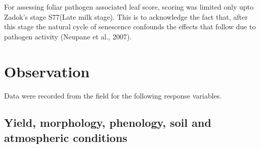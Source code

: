 \documentclass[12pt,oneside]{dukestatscithesis} %
\theoremstyle{definition}
\theoremstyle{definition}
\theoremstyle{definition}
\theoremstyle{remark}
\begin{document}
For assessing foliar pathogen associated leaf score, scoring was limited
only upto Zadok's stage S77(Late milk stage). This is to acknowledge the
fact that, after this stage the natural cycle of senescence confounds
the effects that follow due to pathogen activity (Neupane et al., 2007).

\section{Observation}\label{obs}

Data were recorded from the field for the following response variables.

\subsection{Yield, morphology, phenology, soil and atmospheric
conditions}\label{yield-morphology-phenology-soil-and-atmospheric-conditions}
\end{document}
